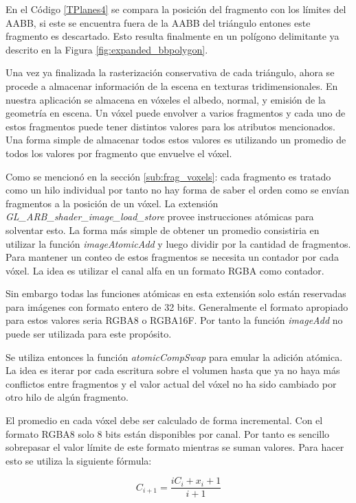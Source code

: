 En el Código \ref{TPlanes4} se compara la posición del fragmento con los límites del \ac{AABB}, si este se encuentra fuera de la \ac{AABB} del triángulo entones este fragmento es descartado. Esto resulta finalmente en un polígono delimitante ya descrito en la Figura \ref{fig:expanded_bbpolygon}.

Una vez ya finalizada la rasterización conservativa de cada triángulo, ahora se procede a almacenar información de la escena en texturas tridimensionales. En nuestra aplicación se almacena en vóxeles el albedo, normal, y emisión de la geometría en escena. Un vóxel puede envolver a varios fragmentos y cada uno de estos fragmentos puede tener distintos valores para los atributos mencionados. Una forma simple de almacenar todos estos valores es utilizando un promedio de todos los valores por fragmento que envuelve el vóxel. 

Como se mencionó en la sección \ref{sub:frag_voxels}: cada fragmento es tratado como un hilo individual por tanto no hay forma de saber el orden como se envían fragmentos a la posición de un vóxel. La extensión \emph{GL\_ARB\_shader\_image\_load\_store} provee instrucciones atómicas para solventar esto. La forma más simple de obtener un promedio consistiria en utilizar la función \emph{imageAtomicAdd} y luego dividir por la cantidad de fragmentos. Para mantener un conteo de estos fragmentos se necesita un contador por cada vóxel. La idea es utilizar el canal alfa en un formato RGBA como contador. 

Sin embargo todas las funciones atómicas en esta extensión solo están reservadas para imágenes con formato entero de 32 bits. Generalmente el formato apropiado para estos valores seria RGBA8 o RGBA16F. Por tanto la función \emph{imageAdd} no puede ser utilizada para este propósito.

Se utiliza entonces la función \emph{atomicCompSwap} para emular la adición atómica. La idea es iterar por cada escritura sobre el volumen hasta que ya no haya más conflictos entre fragmentos y el valor actual del vóxel no ha sido cambiado por otro hilo de algún fragmento.

El promedio en cada vóxel debe ser calculado de forma incremental. Con el formato RGBA8 solo 8 bits están disponibles por canal. Por tanto es sencillo sobrepasar el valor límite de este formato mientras se suman valores. Para hacer esto se utiliza la siguiente fórmula:

\begin{equation}
	C_{i+1} = \frac{iC_{i}+x_i+1}{i+1}
\end{equation}

